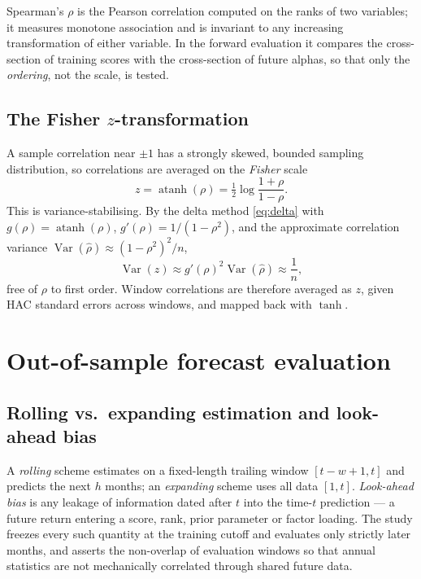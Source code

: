 Spearman's $\rho$ is the Pearson correlation computed on the ranks of two
variables; it measures monotone association and is invariant to any
increasing transformation of either variable. In the forward evaluation it
compares the cross-section of training scores with the cross-section of
future alphas, so that only the \emph{ordering}, not the scale, is tested.

\subsection{The Fisher $z$-transformation}

A sample correlation near $\pm 1$ has a strongly skewed, bounded sampling
distribution, so correlations are averaged on the \emph{Fisher} scale
\begin{equation}
z=\operatorname{atanh}(\rho)=\tfrac12\log\frac{1+\rho}{1-\rho}.
\end{equation}
This is variance-stabilising. By the delta method \eqref{eq:delta} with
$g(\rho)=\operatorname{atanh}(\rho)$, $g'(\rho)=1/(1-\rho^2)$, and the
approximate correlation variance $\operatorname{Var}(\hat\rho)\approx
(1-\rho^2)^2/n$,
\begin{equation}
\operatorname{Var}(z)\approx g'(\rho)^2\operatorname{Var}(\hat\rho)\approx\frac{1}{n},
\end{equation}
free of $\rho$ to first order. Window correlations are therefore averaged
as $z$, given HAC standard errors across windows, and mapped back with
$\tanh$.

\section{Out-of-sample forecast evaluation}\label{prelim-forecast}

\subsection{Rolling vs.\ expanding estimation and look-ahead bias}

A \emph{rolling} scheme estimates on a fixed-length trailing window
$[t-w+1,t]$ and predicts the next $h$ months; an \emph{expanding} scheme
uses all data $[1,t]$. \emph{Look-ahead bias} is any leakage of information
dated after $t$ into the time-$t$ prediction --- a future return entering a
score, rank, prior parameter or factor loading. The study freezes every
such quantity at the training cutoff and evaluates only strictly later
months, and asserts the non-overlap of evaluation windows so that annual
statistics are not mechanically correlated through shared future data.


